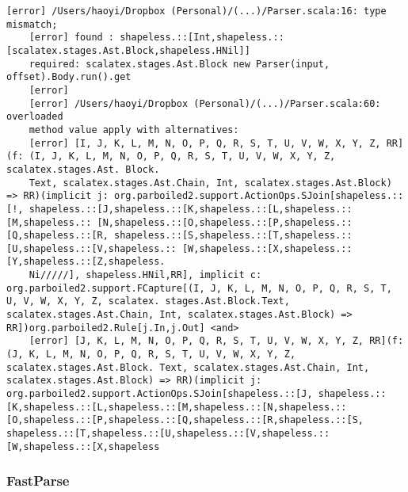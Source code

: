 \begin{lstlisting}[language=terminal, caption={
    Fragment (sic!) błędu wygenerowanego przez bibliotekę \textit{parboiled2}, który pochodzi z prezentacji Li Haoyi na temat \textit{FastParse}\cite{fastparse-talk}.
},label={lst:lstlisting4}]
    [error] /Users/haoyi/Dropbox (Personal)/(...)/Parser.scala:16: type mismatch;
    [error] found : shapeless.::[Int,shapeless.::[scalatex.stages.Ast.Block,shapeless.HNil]]
    required: scalatex.stages.Ast.Block new Parser(input, offset).Body.run().get
    [error]
    [error] /Users/haoyi/Dropbox (Personal)/(...)/Parser.scala:60: overloaded
    method value apply with alternatives:
    [error] [I, J, K, L, M, N, O, P, Q, R, S, T, U, V, W, X, Y, Z, RR](f: (I, J, K, L, M, N, O, P, Q, R, S, T, U, V, W, X, Y, Z, scalatex.stages.Ast. Block.
    Text, scalatex.stages.Ast.Chain, Int, scalatex.stages.Ast.Block) => RR)(implicit j: org.parboiled2.support.ActionOps.SJoin[shapeless.::[!, shapeless.::[J,shapeless.::[K,shapeless.::[L,shapeless.::[M,shapeless.:: [N,shapeless.::[O,shapeless.::[P,shapeless.::[Q,shapeless.::[R, shapeless.::[S,shapeless.::[T,shapeless.::[U,shapeless.::[V,shapeless.:: [W,shapeless.::[X,shapeless.::[Y,shapeless.::[Z,shapeless.
    Ni/////], shapeless.HNil,RR], implicit c: org.parboiled2.support.FCapture[(I, J, K, L, M, N, O, P, Q, R, S, T, U, V, W, X, Y, Z, scalatex. stages.Ast.Block.Text, scalatex.stages.Ast.Chain, Int, scalatex.stages.Ast.Block) => RR])org.parboiled2.Rule[j.In,j.Out] <and>
    [error] [J, K, L, M, N, O, P, Q, R, S, T, U, V, W, X, Y, Z, RR](f: (J, K, L, M, N, O, P, Q, R, S, T, U, V, W, X, Y, Z, scalatex.stages.Ast.Block. Text, scalatex.stages.Ast.Chain, Int, scalatex.stages.Ast.Block) => RR)(implicit j: org.parboiled2.support.ActionOps.SJoin[shapeless.::[J, shapeless.::[K,shapeless.::[L,shapeless.::[M,shapeless.::[N,shapeless.:: [O,shapeless.::[P,shapeless.::[Q,shapeless.::[R,shapeless.::[S, shapeless.::[T,shapeless.::[U,shapeless.::[V,shapeless.:: [W,shapeless.::[X,shapeless
\end{lstlisting}

\subsubsection{FastParse}
\label{subsubsec:fastparse}

